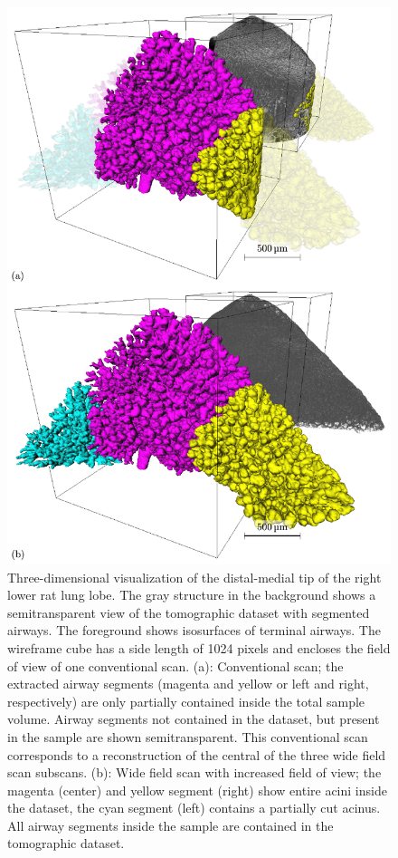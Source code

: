 \begin{figure}[p]
	\centering
	\includegraphics[width=.7\linewidth]{img/Haberthuer2010/Fig05-ConvVsWfs}
	\caption[Three-dimensional visualization of the distal-medial tip of the right lower rat lung lobe]{Three-dimensional visualization of the distal-medial tip of the right lower rat lung lobe. The gray structure in the background shows a semitransparent view of the tomographic dataset with segmented airways. The foreground shows isosurfaces of terminal airways. The wireframe cube has a side length of 1024 pixels and encloses the field of view of one conventional scan. %
	(a): Conventional scan; the extracted airway segments (magenta and yellow or left and right, respectively) are only partially contained inside the total sample volume. Airway segments not contained in the dataset, but present in the sample are shown semitransparent. This conventional scan corresponds to a reconstruction of the central of the three wide field scan subscans. %
	(b): Wide field scan with increased field of view; the magenta (center) and yellow segment (right) show entire acini inside the dataset, the cyan segment (left) contains a partially cut acinus. All airway segments inside the sample are contained in the tomographic dataset.}
	\label{fig:s2-wfs}
\end{figure}

